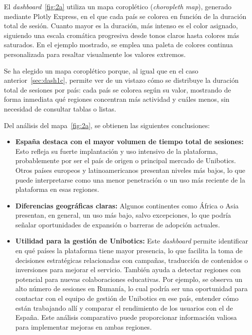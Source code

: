 \documentclass[a4paper, 12pt]{book}
\begin{document}
El \textit{dashboard}~\ref{fig:2a} utiliza un mapa coroplético (\textit{choropleth map}), generado mediante Plotly Express, en el que cada país se colorea en función de la duración total de sesión. Cuanto mayor es la duración, más intenso es el color asignado, siguiendo una escala cromática progresiva desde tonos claros hasta colores más saturados. En el ejemplo mostrado, se emplea una paleta de colores continua personalizada para resaltar visualmente los valores extremos.


Se ha elegido un mapa coroplético porque, al igual que en el caso anterior~\ref{sec:dash1c}, permite ver de un vistazo cómo se distribuye la duración total de sesiones por país: cada país se colorea según su valor, mostrando de forma inmediata qué regiones concentran más actividad y cuáles menos, sin necesidad de consultar tablas o listas.

Del análisis del mapa~\ref{fig:2a}, se obtienen las siguientes conclusiones:

\begin{itemize}
  \item \textbf{España destaca con el mayor volumen de tiempo total de sesiones:} Esto refleja su fuerte implantación y uso intensivo de la plataforma, probablemente por ser el país de origen o principal mercado de Unibotics. Otros países europeos y latinoamericanos presentan niveles más bajos, lo que puede interpretarse como una menor penetración o un uso más reciente de la plataforma en esas regiones.

  \item \textbf{Diferencias geográficas claras:} Algunos continentes como África o Asia presentan, en general, un uso más bajo, salvo excepciones, lo que podría señalar oportunidades de expansión o barreras de adopción actuales.

  \item \textbf{Utilidad para la gestión de Unibotics:} Este \textit{dashboard} permite identificar en qué países la plataforma tiene mayor presencia, lo que facilita la toma de decisiones estratégicas relacionadas con campañas, traducción de contenidos o inversiones para mejorar el servicio. También ayuda a detectar regiones con potencial para nuevas colaboraciones educativas. Por ejemplo, se observa un alto número de sesiones en Rumanía, lo cual podría ser una oportunidad para contactar con el equipo de gestión de Unibotics en ese país, entender cómo están trabajando allí y comparar el rendimiento de los usuarios con el de España. Este análisis comparativo puede proporcionar información valiosa para implementar mejoras en ambas regiones.
\end{itemize}
\end{document}
